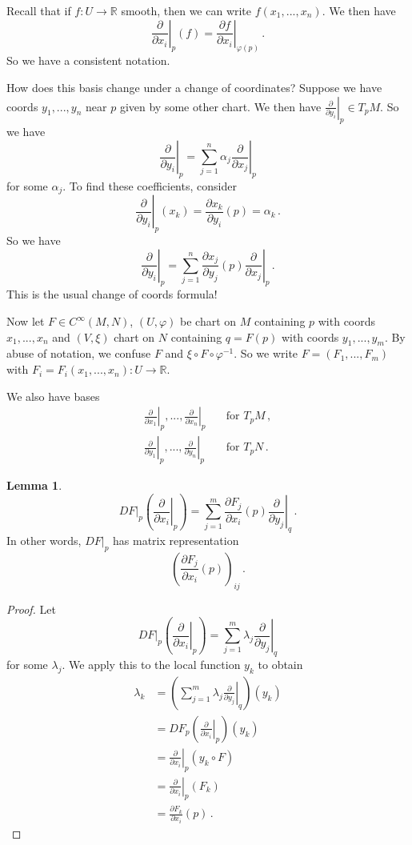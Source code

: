 \documentclass[a4paper,11pt]{article}
\theoremstyle{definition}
\newtheorem*{lem}{Lemma}
\numberwithin{equation}{section}
\begin{document}
Recall that if $f:U\rightarrow\mathbb{R}$ smooth, then we can write $f(x_1,...,x_n)$. We then have
\[
\left.\frac{\partial}{\partial x_i}\right|_p(f)=\left.\frac{\partial f}{\partial x_i}\right|_{\varphi(p)}\,.
\]
So we have a consistent notation.

How does this basis change under a change of coordinates? Suppose we have coords $y_1,...,y_n$ near $p$ given by some other chart. We then have $\left.\frac{\partial}{\partial y_i}\right|_p\in T_pM$. So we have
\[
\left.\frac{\partial}{\partial y_i}\right|_p=\sum_{j=1}^n\alpha_j\left.\frac{\partial}{\partial x_j}\right|_p
\]
for some $\alpha_j$. To find these coefficients, consider
\[
\left.\frac{\partial}{\partial y_i}\right|_p(x_k)=\frac{\partial x_k}{\partial y_i}(p)=\alpha_k\,.
\]
So we have
\[
\left.\frac{\partial}{\partial y_i}\right|_p=\sum_{j=1}^n\frac{\partial x_j}{\partial y_j}(p)\left.\frac{\partial}{\partial x_j}\right|_p\,.
\]
This is the usual change of coords formula!

Now let $F\in C^\infty(M,N)$, $(U,\varphi)$ be chart on $M$ containing $p$ with coords $x_1,...,x_n$ and $(V,\xi)$ chart on $N$ containing $q=F(p)$ with coords $y_1,...,y_m$. By abuse of notation, we confuse $F$ and $\xi\circ F\circ\varphi^{-1}$. So we write $F=(F_1,...,F_m)$ with $F_i=F_i(x_1,...,x_n):U\rightarrow\mathbb{R}$.

We also have bases
\begin{align*}
    \left.\frac{\partial}{\partial x_1}\right|_p,...,\left.\frac{\partial}{\partial x_n}\right|_p\quad&\text{for }T_pM\,,\\
    \left.\frac{\partial}{\partial y_1}\right|_p,...,\left.\frac{\partial}{\partial y_n}\right|_p\quad&\text{for }T_pN\,.
\end{align*}

\begin{lem}
\[
DF|_p\left(\left.\frac{\partial}{\partial x_i}\right|_p\right)=\sum_{j=1}^m\frac{\partial F_j}{\partial x_i}(p)\left.\frac{\partial}{\partial y_j}\right|_q\,.
\]
In other words, $DF|_p$ has matrix representation
\[
\left(\frac{\partial F_j}{\partial x_i}(p)\right)_{ij}\,.
\]
\end{lem}
\begin{proof}
Let
\[
DF|_p\left(\left.\frac{\partial}{\partial x_i}\right|_p\right)=\sum_{j=1}^m\lambda_j\left.\frac{\partial}{\partial y_j}\right|_q
\]
for some $\lambda_j$. We apply this to the local function $y_k$ to obtain
\begin{align*}
    \lambda_k&=\left(\sum_{j=1}^m\lambda_j\left.\frac{\partial}{\partial y_j}\right|_q\right)(y_k)\\
    &=DF_p\left(\left.\frac{\partial}{\partial x_i}\right|_p\right)(y_k)\\
    &=\left.\frac{\partial}{\partial x_i}\right|_p(y_k\circ F)\\
    &=\left.\frac{\partial}{\partial x_i}\right|_p(F_k)\\
    &=\frac{\partial F_k}{\partial x_i}(p)\,.
\end{align*}
\end{proof}
\end{document}
